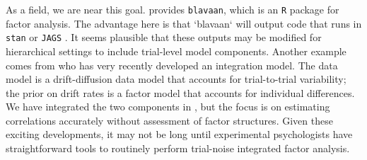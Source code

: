 \documentclass[man, 12pt]{apa7} %
\begin{document}
As a field, we are near this goal.  \textcite{Merkle.etal.2021} provides \texttt{blavaan}, which is an \texttt{R} package for factor analysis.  The advantage here is that `blavaan` will output code that runs in \texttt{stan} \parencite[]{Carpenter.etal.2017} or \texttt{JAGS} \parencite[]{Plummer.2003}.  It seems plausible that these outputs may be modified for hierarchical settings to include trial-level model components.  Another example comes from  \textcite{Stevenson.etal.2024} who has very recently developed an integration model.  The data model is a drift-diffusion data model that accounts for trial-to-trial variability; the prior on drift rates is a factor model that accounts for individual differences.  We have integrated the two components in \textcite{Mehrvarz.Rouder.2024}, but the focus is on estimating correlations accurately without assessment of factor structures.  Given these exciting developments, it may not be long until experimental psychologists have straightforward tools to routinely perform trial-noise integrated factor analysis. 


\printbibliography
\end{document}
